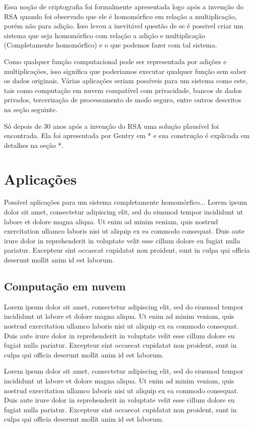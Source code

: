 Essa noção de criptografia foi formalmente apresentada logo após a invenção do RSA quando foi observado que ele é homomórfico em relação a multiplicação, porém não para adição.
Isso levou a inevitável questão de se é possivel criar um sistema que seja homomórfico com relação a adição e multiplicação (Completamente homomórfico) e o que podemos fazer com tal sistema.

Como qualquer função computacional pode ser representada por adições e multiplicações, isso significa que poderiamos executar qualquer função sem saber os dados originais. Várias aplicações seriam possíveis para um sistema como este, tais como computação em nuvem compatível com privacidade, bancos de dados privados, tercerização de processamento de modo seguro, entre outros descritos na seção seguinte.

Só depois de 30 anos após a invenção do RSA uma solução plausível foi encontrada.
Ela foi apresentada por Gentry em * e sua construção é explicada em detalhes na seção *.

\newpage
  
\section{Aplicações}\label{sec:LABEL_CHP_1_SEC_E}
Possível aplicações para um sistema completamente homomórfico...
Lorem ipsum dolor sit amet, consectetur adipiscing elit, sed do eiusmod tempor incididunt ut labore et dolore magna aliqua. Ut enim ad minim veniam, quis nostrud exercitation ullamco laboris nisi ut aliquip ex ea commodo consequat. Duis aute irure dolor in reprehenderit in voluptate velit esse cillum dolore eu fugiat nulla pariatur. Excepteur sint occaecat cupidatat non proident, sunt in culpa qui officia deserunt mollit anim id est laborum.

	\subsection{Computação em nuvem}
	Lorem ipsum dolor sit amet, consectetur adipiscing elit, sed do eiusmod tempor incididunt ut labore et dolore magna aliqua. Ut enim ad minim veniam, quis nostrud exercitation ullamco laboris nisi ut aliquip ex ea commodo consequat. Duis aute irure dolor in reprehenderit in voluptate velit esse cillum dolore eu fugiat nulla pariatur. Excepteur sint occaecat cupidatat non proident, sunt in culpa qui officia deserunt mollit anim id est laborum.
	
	Lorem ipsum dolor sit amet, consectetur adipiscing elit, sed do eiusmod tempor incididunt ut labore et dolore magna aliqua. Ut enim ad minim veniam, quis nostrud exercitation ullamco laboris nisi ut aliquip ex ea commodo consequat. Duis aute irure dolor in reprehenderit in voluptate velit esse cillum dolore eu fugiat nulla pariatur. Excepteur sint occaecat cupidatat non proident, sunt in culpa qui officia deserunt mollit anim id est laborum.
	
